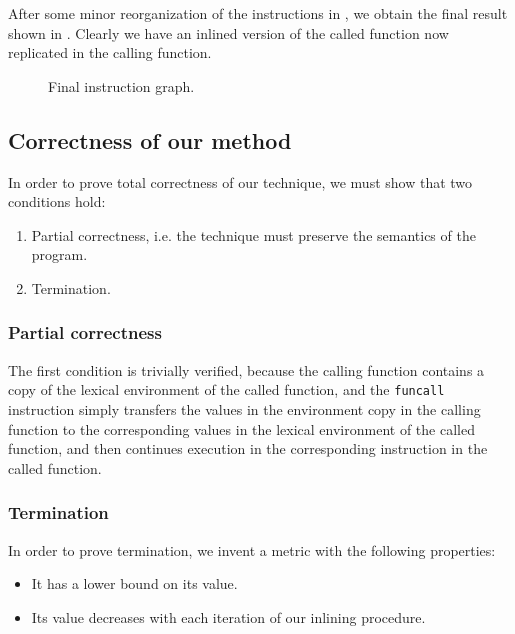 After some minor reorganization of the instructions in ,
we obtain the final result shown in .  Clearly we have an
inlined version of the called function now replicated in the calling
function.

\begin{figure}
\begin{center}
\end{center}
\caption{\label{fig47}
Final instruction graph.}
\end{figure}

\subsection{Correctness of our method}

In order to prove total correctness of our technique, we must show
that two conditions hold:

\begin{enumerate}
\item Partial correctness, i.e. the technique must preserve the
  semantics of the program.
\item Termination.
\end{enumerate}

\subsubsection{Partial correctness}

The first condition is trivially verified, because the calling
function contains a copy of the lexical environment of the called
function, and the \texttt{funcall} instruction simply transfers the
values in the environment copy in the calling function to the
corresponding values in the lexical environment of the called
function, and then continues execution in the corresponding
instruction in the called function.

\subsubsection{Termination}

In order to prove termination, we invent a metric with the following
properties:

\begin{itemize}
\item It has a lower bound on its value.
\item Its value decreases with each iteration of our inlining
  procedure.
\end{itemize}

